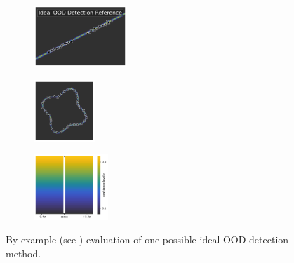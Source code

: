 \begin{figure}[H]
    \centering
    \begin{subfigure}
        \centering
        \includegraphics[width=0.388\textwidth,valign=t]{ood-detection/figures/ood-detection/confidence-line-aa-optimal.pdf}
    \end{subfigure}
    \begin{subfigure}
        \centering
        \includegraphics[width=0.254\textwidth,valign=t]{ood-detection/figures/ood-detection/confidence-circle-aa-optimal.pdf}
    \end{subfigure}
    \begin{subfigure}
        \centering
        \includegraphics[width=0.308\textwidth,valign=t]{ood-detection/figures/ood-detection/confidence-haystack-aa-optimal.pdf}
    \end{subfigure}

    \vspace{-0.25em}
    \caption[Reference Example of one ideal OOD Detector]{By-example (see ) evaluation of one possible ideal OOD detection method.}
    \label{fig:ideal-ood-detection}
\end{figure}

